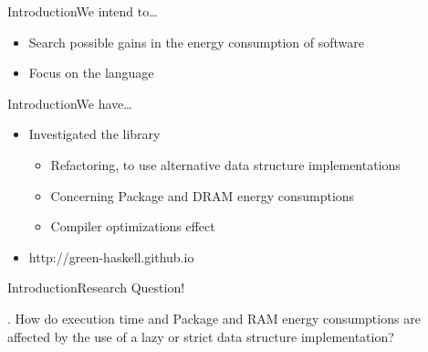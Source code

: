 
    \begin{frame}{Introduction}{We intend to\ldots}

        \begin{itemize}

            \item<1> Search possible gains in the energy consumption of software

            \item<2> Focus on the \Haskell language


        \end{itemize}

    \end{frame}



    \begin{frame}{Introduction}{We have\ldots}

        \begin{itemize}

            \item Investigated the \Edison library

            \begin{itemize}

                \item Refactoring, to use alternative data structure implementations

                \item Concerning Package and DRAM energy consumptions

		\item Compiler optimizations effect


            \end{itemize}

            \item http://green-haskell.github.io


        \end{itemize}


    \end{frame}



    \begin{frame}{Introduction}{Research Question!}


        \RQ{}. How do execution time and Package and RAM energy consumptions are affected by the use of a lazy or strict data structure implementation?


    \end{frame}






